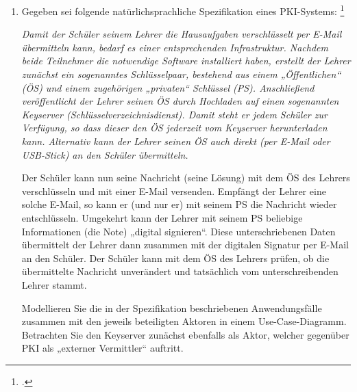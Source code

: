 \documentclass{bschlangaul-aufgabe}
\begin{document}

\begin{enumerate}


\item Gegeben sei folgende natürlichsprachliche Spezifikation eines
PKI-Systems:
\footcite{examen:66116:2016:09}

{
\itshape
Damit der Schüler seinem Lehrer die Hausaufgaben verschlüsselt per
E-Mail übermitteln kann, bedarf es einer entsprechenden Infrastruktur.
Nachdem beide Teilnehmer die notwendige Software installiert haben,
erstellt der Lehrer zunächst ein sogenanntes Schlüsselpaar, bestehend
aus einem „Öffentlichen“ (ÖS) und einem zugehörigen „privaten“ Schlüssel
(PS). Anschließend veröffentlicht der Lehrer seinen ÖS durch Hochladen
auf einen sogenannten Keyserver (Schlüsselverzeichnisdienst). Damit
steht er jedem Schüler zur Verfügung, so dass dieser den ÖS jederzeit
vom Keyserver herunterladen kann. Alternativ kann der Lehrer seinen ÖS
auch direkt (\zB per E-Mail oder USB-Stick) an den Schüler
übermitteln.

Der Schüler kann nun seine Nachricht (\zB seine Lösung) mit dem ÖS
des Lehrers verschlüsseln und mit einer E-Mail versenden. Empfängt der
Lehrer eine solche E-Mail, so kann er (und nur er) mit seinem PS die
Nachricht wieder entschlüsseln. Umgekehrt kann der Lehrer mit seinem PS
beliebige Informationen (\zB die Note) „digital signieren“. Diese
unterschriebenen Daten übermittelt der Lehrer dann zusammen mit der
digitalen Signatur per E-Mail an den Schüler. Der Schüler kann mit dem
ÖS des Lehrers prüfen, ob die übermittelte Nachricht unverändert und
tatsächlich vom unterschreibenden Lehrer stammt.}

Modellieren Sie die in der Spezifikation beschriebenen Anwendungsfälle
zusammen mit den jeweils beteiligten Aktoren in einem Use-Case-Dia\-gramm.
Betrachten Sie den Keyserver zunächst ebenfalls als Aktor, welcher
gegenüber PKI als „externer Vermittler“ auftritt.


\end{enumerate}
\end{document}

